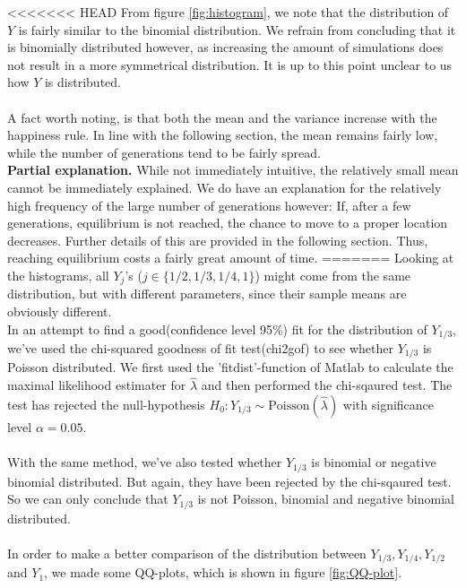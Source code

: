 <<<<<<< HEAD
From figure \ref{fig:histogram}, we note that the distribution of $Y$ is fairly similar to the binomial distribution. We refrain from concluding that it is binomially distributed  however, as increasing the amount of simulations does not result in a more symmetrical distribution. It is up to this point unclear to us how \(Y\) is distributed.\\
\\
A fact worth noting, is that both the mean and the variance increase with the happiness rule. In line with the following section, the mean remains fairly low, while the number of generations tend to be fairly spread.\\
\textbf{Partial explanation.} While not immediately intuitive, the relatively small mean cannot be immediately explained. We do have an explanation for the relatively high frequency of the large number of generations however: If, after a few generations, equilibrium is not reached, the chance to move to a proper location decreases. Further details of this are provided in the following section. Thus, reaching equilibrium costs a fairly great amount of time.
=======
Looking at the histograms, all $Y_j$'s ($j\in \{1/2,1/3,1/4,1\}$) might come from the same distribution, but with different parameters, since their sample means are obviously different.\\
In an attempt to find a good(confidence level 95\%) fit for the distribution of $Y_{1/3}$, we've used the chi-squared goodness of fit test(chi2gof) to see whether $Y_{1/3}$ is Poisson distributed. We first used the 'fitdist'-function of Matlab to calculate the maximal likelihood estimater for $\hat{\lambda}$ and then performed the chi-sqaured test. The test has rejected the null-hypothesis $H_0:Y_{1/3}\sim\text{Poisson}(\hat{\lambda})$ with significance level $\alpha=0.05$. \\   
\\
With the same method, we've also tested whether $Y_{1/3}$ is binomial or negative binomial distributed. But again, they have been rejected by the chi-sqaured test. So we can only conclude that $Y_{1/3}$ is not Poisson, binomial and negative binomial distributed.\\
\\
In order to make a better comparison of the distribution between $Y_{1/3},Y_{1/4},Y_{1/2}$ and $Y_1$, we made some QQ-plots, which is shown in figure \ref{fig:QQ-plot}.\\ 
